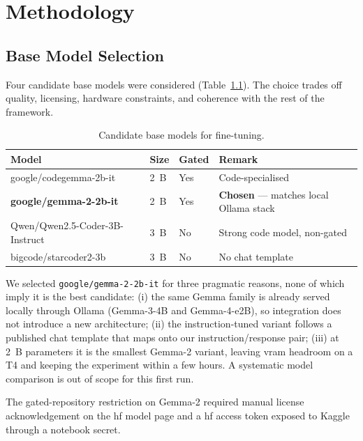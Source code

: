 \documentclass[12pt, a4paper]{report}
\begin{document}
\chapter{Methodology}
\label{ch:methodology}

\section{Base Model Selection}

Four candidate base models were considered
(Table~\ref{tab:model-candidates}). The choice trades off quality,
licensing, hardware constraints, and coherence with the rest of the
framework.

\begin{table}[H]
  \centering
  \caption{Candidate base models for fine-tuning.}
  \label{tab:model-candidates}
  \small
  \begin{tabular}{lllp{4.2cm}}
    \toprule
    \textbf{Model} & \textbf{Size} & \textbf{Gated} & \textbf{Remark} \\
    \midrule
    google/codegemma-2b-it         & 2~B & Yes & Code-specialised \\
    \textbf{google/gemma-2-2b-it}  & 2~B & Yes & \textbf{Chosen} --- matches local Ollama stack \\
    Qwen/Qwen2.5-Coder-3B-Instruct & 3~B & No  & Strong code model, non-gated \\
    bigcode/starcoder2-3b          & 3~B & No  & No chat template \\
    \bottomrule
  \end{tabular}
\end{table}

We selected \texttt{google/gemma-2-2b-it} for three pragmatic reasons,
none of which imply it is the best candidate: (i) the same Gemma family
is already served locally through Ollama (Gemma-3-4B and Gemma-4-e2B),
so integration does not introduce a new architecture; (ii) the
instruction-tuned variant follows a published chat template that maps
onto our instruction/response pair; (iii) at 2~B parameters it is the
smallest Gemma-2 variant, leaving \gls{vram} headroom on a T4 and
keeping the experiment within a few hours. A systematic model comparison
is out of scope for this first run.

The gated-repository restriction on Gemma-2 required manual license
acknowledgement on the \gls{hf} model page and a \gls{hf} access token
exposed to Kaggle through a notebook secret.
\end{document}
